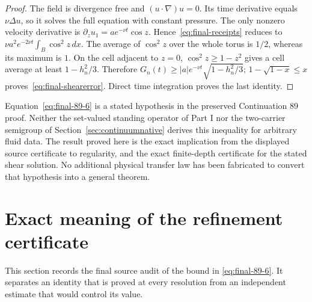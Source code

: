 \begin{proof}
The field is divergence free and $(u\cdot\nabla)u=0$. Its time derivative equals $\nu\Delta u$, so it solves the full equation with constant pressure. The only nonzero velocity derivative is $\partial_z u_1=a e^{-\nu t}\cos z$. Hence~\eqref{eq:final-receipts} reduces to $\nu a^2e^{-2\nu t}\int_B\cos^2 z\,dx$. The average of $\cos^2z$ over the whole torus is $1/2$, whereas its maximum is $1$. On the cell adjacent to $z=0$, $\cos^2z\ge1-z^2$ gives a cell average at least $1-h_n^2/3$. Therefore $G_n(t)\ge|a|e^{-\nu t}\sqrt{1-h_n^2/3}$; $1-\sqrt{1-x}\le x$ proves~\eqref{eq:final-shearerror}. Direct time integration proves the last identity.
\end{proof}
\begin{remark}
Equation~\eqref{eq:final-89-6} is a stated hypothesis in the preserved Continuation 89 proof. Neither the set-valued standing operator of Part I nor the two-carrier semigroup of Section~\ref{sec:continuumnative} derives this inequality for arbitrary fluid data. The result proved here is the exact implication from the displayed source certificate to regularity, and the exact finite-depth certificate for the stated shear solution. No additional physical transfer law has been fabricated to convert that hypothesis into a general theorem.
\end{remark}


\section{Exact meaning of the refinement certificate}
\label{sec:exact-certificate}
This section records the final source audit of the bound in
\eqref{eq:final-89-6}. It separates an identity that is proved at every
resolution from an independent estimate that would control its value.

